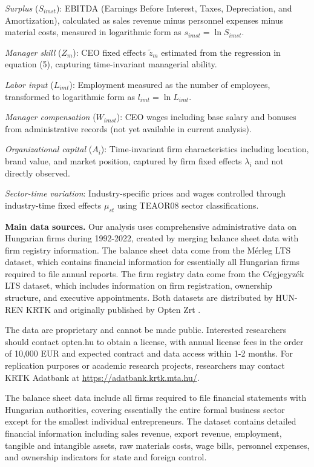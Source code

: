 \documentclass[11pt,a4paper]{article}
\begin{document}
\textit{Surplus} ($S_{imst}$): EBITDA (Earnings Before Interest, Taxes, Depreciation, and Amortization), calculated as sales revenue minus personnel expenses minus material costs, measured in logarithmic form as $s_{imst} = \ln S_{imst}$.

\textit{Manager skill} ($Z_m$): CEO fixed effects $\tilde{z}_m$ estimated from the regression in equation (5), capturing time-invariant managerial ability.

\textit{Labor input} ($L_{imt}$): Employment measured as the number of employees, transformed to logarithmic form as $l_{imt} = \ln L_{imt}$.

\textit{Manager compensation} ($W_{imst}$): CEO wages including base salary and bonuses from administrative records (not yet available in current analysis).

\textit{Organizational capital} ($A_i$): Time-invariant firm characteristics including location, brand value, and market position, captured by firm fixed effects $\lambda_i$ and not directly observed.

\textit{Sector-time variation}: Industry-specific prices and wages controlled through industry-time fixed effects $\mu_{st}$ using TEAOR08 sector classifications.

\textbf{Main data sources.} Our analysis uses comprehensive administrative data on Hungarian firms during 1992-2022, created by merging balance sheet data with firm registry information. The balance sheet data come from the Mérleg LTS dataset, which contains financial information for essentially all Hungarian firms required to file annual reports. The firm registry data come from the Cégjegyzék LTS dataset, which includes information on firm registration, ownership structure, and executive appointments. Both datasets are distributed by HUN-REN KRTK and originally published by Opten Zrt \citep{merleg2024,cegjegyzek2024}.

The data are proprietary and cannot be made public. Interested researchers should contact opten.hu to obtain a license, with annual license fees in the order of 10,000 EUR and expected contract and data access within 1-2 months. For replication purposes or academic research projects, researchers may contact KRTK Adatbank at \url{https://adatbank.krtk.mta.hu/}.

The balance sheet data include all firms required to file financial statements with Hungarian authorities, covering essentially the entire formal business sector except for the smallest individual entrepreneurs. The dataset contains detailed financial information including sales revenue, export revenue, employment, tangible and intangible assets, raw materials costs, wage bills, personnel expenses, and ownership indicators for state and foreign control.
\end{document}
